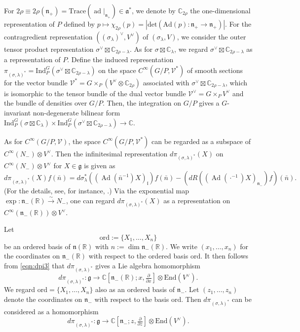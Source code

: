 \documentclass[a4paper,11pt,reqno]{amsart}
\newcommand{\frakg}{\mathfrak{g}}
\newcommand{\frakn}{\mathfrak{n}}
\newcommand{\CC}{\mathbb{C}}
\newcommand{\0}{{\bf 0}}
\newcommand{\R}{\mathbb{R}}
\newcommand{\C}{\mathbb{C}}
\newcommand{\1}{{\bf 1}}
\DeclareMathOperator{\ad}{ad}
\DeclareMathOperator{\Ad}{Ad}
\newcommand{\frakl}{{\mathfrak l}}
\newcommand{\abs}[1]{\left\vert#1\right\vert}
\newcommand{\ord}{{\mathrm{ord}}}
\DeclareMathOperator{\To}{\longrightarrow}
\theoremstyle{plain}
\theoremstyle{definition}
\numberwithin{equation}{section}
\theoremstyle{definition}
\begin{document}
For $2\rho\equiv 2\rho(\frakn_+)= \mathrm{Trace}(\ad\vert_{\frakn_+})\in \mathfrak{a}^*$,
we denote by  $\C_{2\rho}$ the one-dimensional representation of $P$
defined by
$p \mapsto \chi_{2\rho}(p)=
\abs{\mathrm{det}(\mathrm{Ad}(p)\colon 
\mathfrak{n}_+ \to \mathfrak{n}_+)}$.
For the contragredient representation
$((\sigma_\lambda)^\vee, V^\vee)$ of $(\sigma_\lambda,V)$,
we consider the outer tensor product representation
$\sigma^\vee \boxtimes \C_{2\rho-\lambda}$.
As for $\sigma \boxtimes \CC_\lambda$, 
we regard $\sigma^\vee \boxtimes \C_{2\rho-\lambda}$ 
as a representation of $P$.
Define the induced representation
$\pi_{(\sigma, \lambda)^*} 
= \mathrm{Ind}_P^G(\sigma^\vee\boxtimes\CC_{2\rho-\lambda})$
on the space $C^\infty(G/P,\mathcal{V}^*)$ of smooth sections 
for the vector bundle $\mathcal{V}^*=G\times_P (V^\vee\otimes \C_{2\rho})$
associated with $\sigma^\vee \boxtimes \C_{2\rho-\lambda}$, 
which is isomorphic to the tensor bundle
of the dual vector bundle $\mathcal{V}^\vee = G\times_PV^\vee$ and the bundle
of densities over $G/P$.
Then, the integration on $G/P$ gives a 
$G$-invariant non-degenerate bilinear form
$
\mathrm{Ind}_P^G(\sigma\boxtimes\CC_{\lambda})
\times 
\mathrm{Ind}_P^G(\sigma^\vee\boxtimes\CC_{2\rho-\lambda}) \to \C.
$

As for $C^\infty(G/P,\mathcal{V})$,
the space $C^\infty(G/P,\mathcal{V}^*)$ can be regarded as 
a subspace of $C^\infty(N_-) \otimes V^\vee$.
Then the infinitesimal representation $d\pi_{(\sigma,\lambda)^*}(X)$
on $C^\infty(N_-)\otimes V^\vee$
for $X \in \frakg$ is given as
\begin{equation}\label{eqn:dpi3}
d\pi_{(\sigma,\lambda)^*}(X)f(\bar{n})
=d\sigma_\lambda^*((\Ad(\bar{n}^{-1})X)_\frakl)f(\bar{n})
-\left(dR((\Ad(\cdot^{-1})X)_{\frakn_-})f\right)(\bar{n}).
\end{equation}
(For the details, see, for instance, \cite[Sect.\ 2]{KuOr25a}.)
Via the exponential map $\exp\colon \frakn_-(\R) \xrightarrow{\sim}  N_-$, one can regard
$d\pi_{(\sigma,\lambda)^*}(X)$ as a representation 
on $C^\infty(\mathfrak{n}_-(\R)) \otimes V^\vee$.

Let  
\begin{equation}\label{eqn:ord-n}
\ord:=\{X_1,\ldots, X_n\}
\end{equation}
be an ordered basis of $\frakn(\R)$
with $n:=\dim \frakn_-(\R)$.
We write $(x_1, \ldots, x_n)$ for the coordinates on $\frakn_-(\R)$ with respect to 
the ordered basis $\ord$.
It then follows from \eqref{eqn:dpi3} that 
$d\pi_{(\sigma,\lambda)^*}$ gives a Lie algebra homomorphism
\begin{equation*}
d\pi_{(\sigma,\lambda)^*}\colon \mathfrak{g} \To 
\C[\frakn_-(\R);x, \tfrac{\partial}{\partial x}]  \otimes \mathrm{End}(V^\vee).
\end{equation*}
We regard $\ord=\{X_1,\ldots, X_n\}$ also as an ordered basis of $\frakn_-$.
Let  $(z_1, \ldots, z_n)$ denote the coordinates on $\frakn_-$
with respect to the basis $\ord$.
Then $d\pi_{(\sigma,\lambda)^*}$ can be considered as a homomorphism
\begin{equation}\label{eqn:dpi-complex-g}
d\pi_{(\sigma,\lambda)^*}\colon \mathfrak{g} \To 
\C[\frakn_-;z, \tfrac{\partial}{\partial z}]  \otimes \mathrm{End}(V^\vee).
\end{equation}
\end{document}
